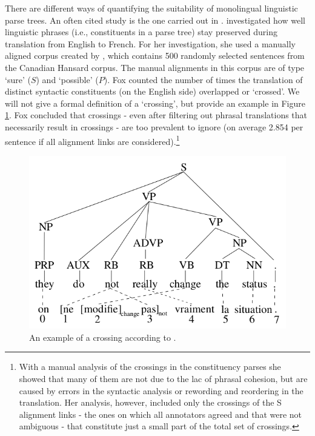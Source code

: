 There are different ways of quantifying the suitability of monolingual linguistic parse trees. An often cited study is the one carried out in \cite{fox2002phrasal}. \citeauthor{fox2002phrasal} investigated how well linguistic phrases (i.e., constituents in a parse tree) stay preserved during translation from English to French. For her investigation, she used a manually aligned corpus created by \cite{och2000improved}, which contains 500 randomly selected sentences from the Canadian Hansard corpus. The manual alignments in this corpus are of type `sure' ($S$) and `possible' ($P$). Fox counted the number of times the translation of distinct syntactic constituents (on the English side) overlapped or `crossed'. We will not give a formal definition of a `crossing', but provide an example in Figure \ref{fig:fox}. Fox concluded that crossings - even after filtering out phrasal translations that necessarily result in crossings - are too prevalent to ignore (on average 2.854 per sentence if all alignment links are considered).\footnote{With a manual analysis of the crossings in the constituency parses she showed that many of them are not due to the lac of phrasal cohesion, but are caused by errors in the syntactic analysis or rewording and reordering in the translation. Her analysis, however, included only the crossings of the S alignment links - the ones on which all annotators agreed and that were not ambiguous - that constitute just a small part of the total set of crossings.}


\begin{figure}[!ht]
\centering
\includegraphics[scale=0.4]{Graphics/crossing.png}
\caption{An example of a crossing according to \cite{fox2002phrasal}.}\label{fig:fox}
\end{figure}

